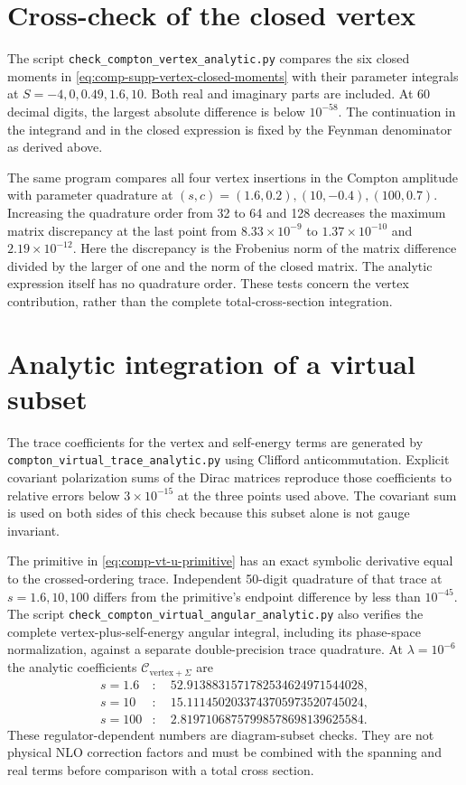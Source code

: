 \section{Cross-check of the closed vertex}
The script \texttt{check\_compton\_vertex\_analytic.py} compares
the six closed moments in \eqref{eq:comp-supp-vertex-closed-moments}
with their parameter integrals at $S=-4,0,0.49,1.6,10$.
Both real and imaginary parts are included. At 60 decimal digits,
the largest absolute difference is below $10^{-58}$.
The continuation in the integrand and in the closed expression
is fixed by the Feynman denominator as derived above.

The same program compares all four vertex insertions in the
Compton amplitude with parameter quadrature at
$(s,c)=(1.6,0.2),(10,-0.4),(100,0.7)$.
Increasing the quadrature order from 32 to 64 and 128 decreases
the maximum matrix discrepancy at the last point from
$8.33\times10^{-9}$ to $1.37\times10^{-10}$ and
$2.19\times10^{-12}$. Here the discrepancy is the Frobenius norm
of the matrix difference divided by the larger of one and the
norm of the closed matrix. The analytic expression itself has
no quadrature order. These tests concern the vertex contribution,
rather than the complete total-cross-section integration.

\section{Analytic integration of a virtual subset}
The trace coefficients for the vertex and self-energy terms are
generated by \nolinkurl{compton_virtual_trace_analytic.py} using
Clifford anticommutation. Explicit covariant polarization sums of
the Dirac matrices reproduce those coefficients to relative errors
below $3\times10^{-15}$ at the three points used above.
The covariant sum is used on both sides of this check because this
subset alone is not gauge invariant.

The primitive in \eqref{eq:comp-vt-u-primitive} has an exact symbolic
derivative equal to the crossed-ordering trace. Independent
50-digit quadrature of that trace at $s=1.6,10,100$ differs from
the primitive's endpoint difference by less than $10^{-45}$.
The script \nolinkurl{check_compton_virtual_angular_analytic.py}
also verifies the complete vertex-plus-self-energy angular integral,
including its phase-space normalization, against a separate
double-precision trace quadrature. At $\lambda=10^{-6}$ the analytic
coefficients $\mathcal C_{\mathrm{vertex}+\Sigma}$ are
\begin{align}
 s=1.6 &: \quad 52.9138831571782534624971544028,\\
 s=10 &: \quad 15.1114502033743705973520745024,\\
 s=100 &: \quad 2.81971068757998578698139625584.
\end{align}
These regulator-dependent numbers are diagram-subset checks.
They are not physical NLO correction factors and must be combined
with the spanning and real terms before comparison with a total
cross section.

